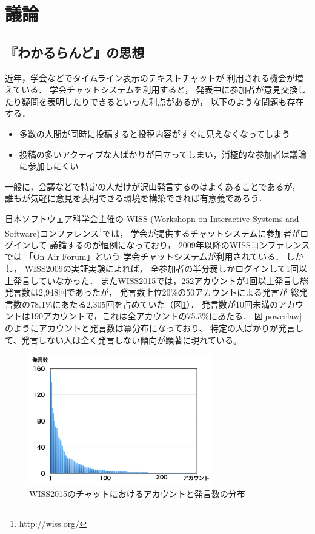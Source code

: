 \section{議論}

\subsection{『わかるらんど』の思想}

近年，学会などでタイムライン表示のテキストチャットが
利用される機会が増えている\cite{goto2012}．
学会チャットシステムを利用すると，
発表中に参加者が意見交換したり疑問を表明したりできるといった利点があるが，
以下のような問題も存在する．

\begin{itemize}
\item 多数の人間が同時に投稿すると投稿内容がすぐに見えなくなってしまう
\item 投稿の多いアクティブな人ばかりが目立ってしまい，消極的な参加者は議論に参加しにくい
\end{itemize}

一般に，会議などで特定の人だけが沢山発言するのはよくあることであるが，
誰もが気軽に意見を表明できる環境を構築できれば有意義であろう．

日本ソフトウェア科学会主催の
WISS (Workshopn on Interactive Systems and Software)コンファレンス\footnote{
  \textsf{http://wiss.org/}
}では，
学会が提供するチャットシステムに参加者がログインして
議論するのが恒例になっており\cite{wiss_challenge}，
2009年以降のWISSコンファレンスでは
「On Air Forum」\cite{nishida2011}という
学会チャットシステムが利用されている．
%
しかし，
WISS2009の実証実験によれば，
全参加者の半分弱しかログインして1回以上発言していなかった．
またWISS2015では，252アカウントが1回以上発言し総発言数は2,948回であったが，
発言数上位20\%の50アカウントによる発言が
総発言数の78.1\%にあたる2,305回を占めていた（図\ref{wisschat}）．
発言数が10回未満のアカウントは190アカウントで，これは全アカウントの75.3\%にあたる．
図\ref{powerlaw}のようにアカウントと発言数は冪分布になっており、
特定の人ばかりが発言して、発言しない人は全く発言しない傾向が顕著に現れている。

\begin{figure}[h]
\centering\includegraphics[width=8cm]{images/wisschat.png}
\caption{WISS2015のチャットにおけるアカウントと発言数の分布}
\label{wisschat}
\end{figure}

